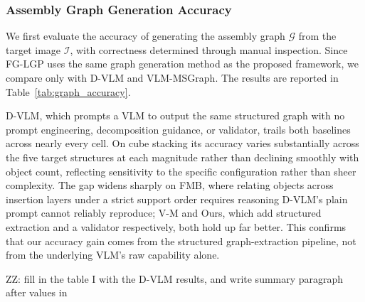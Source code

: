 \documentclass[letterpaper, 10 pt, conference]{ieeeconf}  %
\newcommand{\zz}[1]{{\color{red}ZZ: #1}}
\begin{document}
\subsubsection{Assembly Graph Generation Accuracy}
We first evaluate the accuracy of generating the assembly graph $\mathcal{G}$ from the target image $\mathcal{I}$, with correctness determined through manual inspection. 
Since FG-LGP uses the same graph generation method as the proposed framework, we compare only with D-VLM and VLM-MSGraph. 
The results are reported in Table~\ref{tab:graph_accuracy}.

D-VLM, which prompts a VLM to output the same structured graph with no prompt engineering, decomposition guidance, or validator, trails both baselines across nearly every cell. On cube stacking its accuracy varies substantially across the five target structures at each magnitude rather than declining smoothly with object count, reflecting sensitivity to the specific configuration rather than sheer complexity. The gap widens sharply on FMB, where relating objects across insertion layers under a strict support order requires reasoning D-VLM's plain prompt cannot reliably reproduce; V-M and Ours, which add structured extraction and a validator respectively, both hold up far better. This confirms that our accuracy gain comes from the structured graph-extraction pipeline, not from the underlying VLM's raw capability alone.

\zz{fill in the table I with the D-VLM results, and write summary paragraph after values in}


\end{document}
